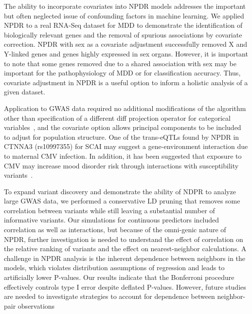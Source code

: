 \documentclass{bioinfo}
\begin{document}

The ability to incorporate covariates into NPDR models addresses the important but often neglected issue of confounding factors in machine learning.
We applied NPDR to a real RNA-Seq dataset for MDD to demonstrate the identification of biologically relevant genes and the removal of spurious associations by covariate correction.
NPDR with sex as a covariate adjustment successfully removed X and Y-linked genes and genes highly expressed in sex organs.
However, it is important to note that some genes removed due to a shared association with sex may be important for the pathophysiology of MDD or for classification accuracy.
Thus, covariate adjustment in NPDR is a useful option to inform a holistic analysis of a given dataset.

Application to GWAS data required no additional modifications of the algorithm other than specification of a different diff projection operator for categorical variables~\citep{titv}, and the covariate option allows principal components to be included to adjust for population structure.
One of the trans-eQTLs found by NPDR in CTNNA3 (rs10997355) for SCAI may suggest a gene-environment interaction due to maternal CMV infection.
In addition, it has been suggested that exposure to CMV may increase mood disorder risk through interactions with susceptibility variants~\citep{kim2007exposure}.

To expand variant discovery and demonstrate the ability of NDPR to analyze large GWAS data, we performed a conservative LD pruning that removes some correlation between variants while still leaving a substantial number of informative variants.
Our simulations for continuous predictors included correlation as well as interactions, but because of the omni-genic nature of NPDR, further investigation is needed to understand the effect of correlation on the relative ranking of variants and the effect on nearest-neighbor calculations.
A challenge in NPDR analysis is the inherent dependence between neighbors in the models, which violates distribution assumptions of regression and leads to artificially lower P-values. Our results indicate that the Bonferroni procedure effectively controls type I error despite deflated P-values. However, future studies are needed to investigate strategies to account for dependence between neighbor-pair observations
\end{document}
